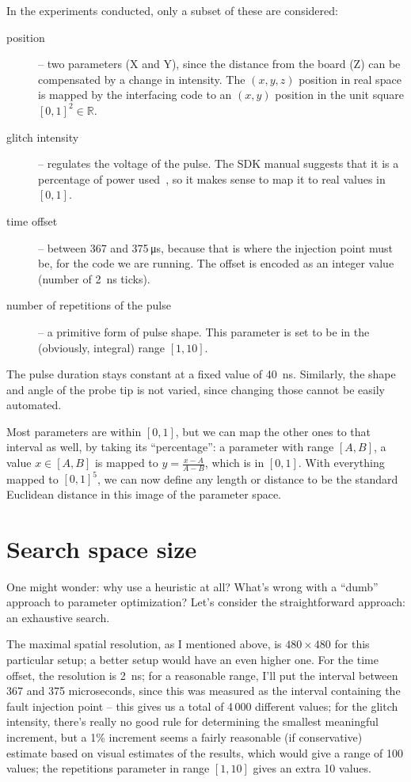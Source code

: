 \documentclass[times, utf8, diplomski]{fer}
\begin{document}
In the experiments conducted, only a subset of these are considered:
\begin{description}
  \item[position] -- two parameters (X and Y), since the distance from the board
        (Z) can be compensated by a change in intensity. The $(x,y,z)$ position
        in real space is mapped by the interfacing code to an $(x,y)$ position
        in the unit square $[0,1]^2 \in \mathbb{R}$.
  \item[glitch intensity] -- regulates the voltage of the pulse. The SDK manual
        suggests that it is a percentage of power used~\cite{RiscureVCGmanual},
        so it makes sense to map it to real values in $[0,1]$.
  \item[time offset] -- between 367 and 375\,\si{\micro\second}, because that is
        where the injection point must be, for the code we are running. The offset
        is encoded as an integer value (number of \SI{2}{\nano\second} ticks).
  \item[number of repetitions of the pulse] -- a primitive form of pulse shape.
        This parameter is set to be in the (obviously, integral) range $[1, 10]$.
\end{description}

The pulse duration stays constant at a fixed value of \SI{40}{\nano\second}.
Similarly, the shape and angle of the probe tip is not varied, since changing
those cannot be easily automated.

Most parameters are within $[0,1]$, but we can map the other ones to that
interval as well, by taking its ``percentage'': a parameter with range $[A,B]$,
a value $x \in [A,B]$ is mapped to $y = \frac{x-A}{A-B}$, which is in $[0,1]$.
With everything mapped to $[0,1]^5$, we can now define any length or distance
to be the standard Euclidean distance in this image of the parameter space.


\section{Search space size}\label{sec:search_space}
One might wonder: why use a heuristic at all? What's wrong with a ``dumb''
approach to parameter optimization? Let's consider the straightforward
approach: an exhaustive search.

The maximal spatial resolution, as I mentioned above, is $480 \times 480$ for
this particular setup; a better setup would have an even higher one. For the
time offset, the resolution is \SI{2}{\nano\second}; for a reasonable range,
I'll put the interval between 367 and 375 microseconds, since this was measured
as the interval containing the fault injection point -- this gives us a total of
4\,000 different values; for the glitch intensity, there's really no good rule
for determining the smallest meaningful increment, but a 1\% increment seems
a fairly reasonable (if conservative) estimate based on visual estimates of
the results, which would give a range of 100 values; the repetitions parameter
in range $[1,10]$ gives an extra 10 values.
\end{document}
